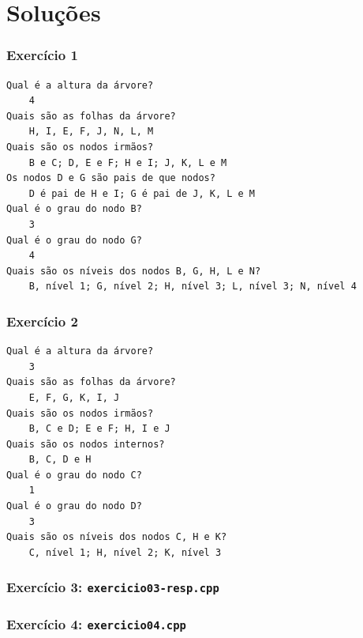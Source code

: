 \documentclass[aspectratio=169]{beamer}
\begin{document}
\section{Soluções}

\begin{frame}[fragile]\frametitle{Exercício 1}
\small{
\begin{verbatim}
Qual é a altura da árvore?
    4
Quais são as folhas da árvore?
    H, I, E, F, J, N, L, M
Quais são os nodos irmãos?
    B e C; D, E e F; H e I; J, K, L e M
Os nodos D e G são pais de que nodos?
    D é pai de H e I; G é pai de J, K, L e M
Qual é o grau do nodo B?
    3
Qual é o grau do nodo G?
    4
Quais são os níveis dos nodos B, G, H, L e N? 
    B, nível 1; G, nível 2; H, nível 3; L, nível 3; N, nível 4
\end{verbatim}
}
\end{frame}

\begin{frame}[fragile]\frametitle{Exercício 2}
\small{
\begin{verbatim}
Qual é a altura da árvore?
    3
Quais são as folhas da árvore?
    E, F, G, K, I, J
Quais são os nodos irmãos?
    B, C e D; E e F; H, I e J
Quais são os nodos internos?
    B, C, D e H
Qual é o grau do nodo C?
    1
Qual é o grau do nodo D?
    3
Quais são os níveis dos nodos C, H e K?
    C, nível 1; H, nível 2; K, nível 3
\end{verbatim}
}
\end{frame}

\begin{frame}[fragile]\frametitle{Exercício 3: \texttt{exercicio03-resp.cpp}}
\fontsize{3pt}{5pt}\selectfont{

}
\end{frame}

\begin{frame}[fragile]\frametitle{Exercício 4: \texttt{exercicio04.cpp}}
\fontsize{3pt}{5pt}\selectfont{

}
\end{frame}

\end{document}
